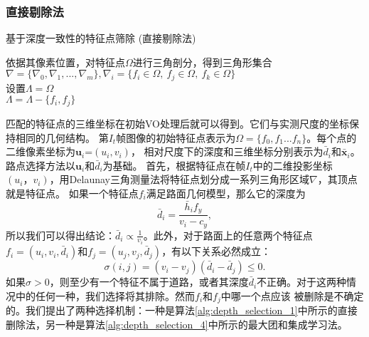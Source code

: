 \subsubsection{直接剔除法}
\begin{algorithm}
    \caption{基于深度一致性的特征点筛除 (直接剔除法)}
    依据其像素位置，对特征点$\Omega$进行三角剖分，得到三角形集合$\nabla =\{\nabla_0,\nabla_1,...,\nabla_m\},%
    \nabla_{i}=\{f_i\in\Omega,\ f_j\in\Omega,\ f_k\in\Omega\}$\\
    设置$\Lambda = \Omega$\\
     {   
         {
             {
                 $\Lambda = \Lambda - \{f_i,f_j\}$
             }
         }
     }
  \label{alg:depth_selection_1}
\end{algorithm}
匹配的特征点的三维坐标在初始VO处理后就可以得到。它们与实测尺度的坐标保持相同的几何结构。
第$I_t$帧图像的初始特征点表示为$\Omega=\{f_0,f_1...f_{n}\}$。每个点的二维像素坐标为$\textbf{u}_i$=$(u_i,v_i)$，
相对尺度下的深度和三维坐标分别表示为$\bar{d}_i$和$\mathbf{\bar{x}}_i$。路点选择方法以$\textbf{u}_i$和$\bar{d}_i$为基础。
首先，根据特征点在帧$I_t$中的二维投影坐标$(u_i，v_i)$，用Delaunay三角测量法将特征点划分成一系列三角形区域$\nabla$，其顶点就是特征点。
如果一个特征点$f_i$满足路面几何模型，那么它的深度为
\begin{equation}
    \bar{d}_i = \frac{{\bar{h}}_i f_y} {v_i-c_y},
\end{equation}
所以我们可以得出结论：$\bar{d}_i\propto\frac{1} {v_i}$。此外，对于路面上的任意两个特征点
$f_i=(u_i, v_i, \bar{d}_i)$和$f_j=(u_j, v_j, \bar{d}_j)$，有以下关系必然成立：
\begin{equation}
    \sigma(i,j)= (v_i - v_j)(\bar{d}_i-\bar{d}_j)\leq 0. 
\label{eq:depth}
\end{equation}
如果$\sigma>0$，则至少有一个特征不属于道路，或者其深度$\bar{d}_i$不正确。对于这两种情况中的任何一种，我们选择将其排除。然而$f_i$和$f_j$中哪一个点应该
被删除是不确定的。我们提出了两种选择机制：一种是算法\ref{alg:depth_selection_1}中所示的直接删除法，另一种是算法\ref{alg:depth_selection_4}中所示的最大团和集成学习法。
